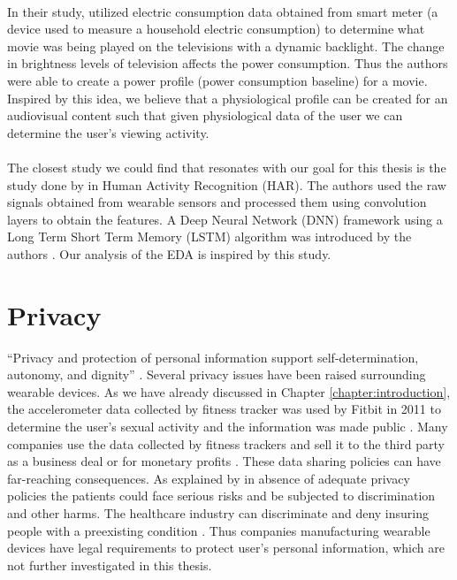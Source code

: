\paragraph{} In their study, \citeauthor{greveler_multimedia_nodate} \cite{greveler_multimedia_nodate} utilized electric consumption data obtained from smart meter (a device used to measure a household electric consumption) to determine what movie was being played on the televisions with a dynamic backlight. The change in brightness levels of television affects the power consumption. Thus the authors were able to create a power profile (power consumption baseline) for a movie. Inspired by this idea, we believe that a physiological profile can be created for an audiovisual content such that given physiological data of the user we can determine the user's viewing activity.

\paragraph{} The closest study we could find that resonates with our goal for this thesis is the study done by \citeauthor{ordonez_deep_2016} in Human Activity Recognition (HAR). The authors used the raw signals obtained from wearable sensors and processed them using convolution layers to obtain the features. A Deep Neural Network (DNN) framework using a Long Term Short Term Memory (LSTM) algorithm was introduced by the authors \cite{ordonez_deep_2016}. Our analysis of the EDA is inspired by this study. 

\section{Privacy} \enquote{Privacy and protection of personal information support self-determination, autonomy, and dignity} \cite{hurley_taking_2014}. Several privacy issues have been raised surrounding wearable devices. As we have already discussed in Chapter \ref{chapter:introduction}, the accelerometer data collected by fitness tracker was used by Fitbit in 2011 to determine the user's sexual activity and the information was made public \cite{Fitbit}. Many companies use the data collected by fitness trackers and sell it to the third party as a business deal or for monetary profits \cite{ever_step_you_fake}. These data sharing policies can have far-reaching consequences. As explained by \citeauthor{montgomery_health_nodate} in absence of adequate privacy policies the patients could face serious risks and be subjected to discrimination and other harms. The healthcare industry can discriminate and deny insuring people with a preexisting condition \cite{montgomery_health_nodate}. Thus companies manufacturing wearable devices have legal requirements to protect user's personal information, which are not further investigated in this thesis.

